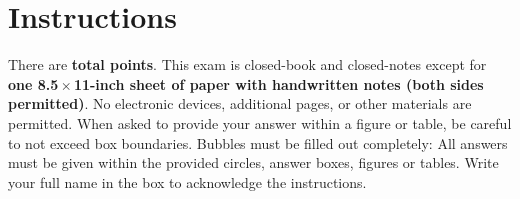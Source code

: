 \section*{Instructions}

There are {\bf {} total points}. This exam is closed-book and
closed-notes except for {\bf one 8.5\,$\times$\,11-inch sheet of paper with
handwritten notes (both sides permitted)}. No electronic devices, additional
pages, or other materials are permitted. When asked to provide your
answer within a figure or table, be careful to not exceed box boundaries.
Bubbles must be filled out completely: 
 All answers must be given within the provided
circles, answer boxes, figures or tables. Write your full name in the box to
acknowledge the instructions.

